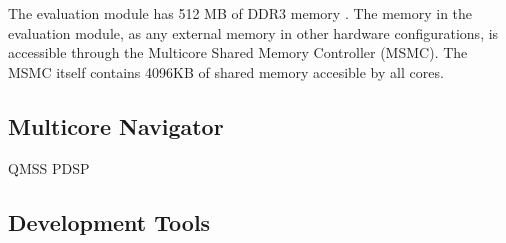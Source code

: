 The evaluation module has 512 MB of DDR3 memory \cite{evmref}. The memory in
the evaluation module, as any external memory in other hardware configurations,
is accessible through the Multicore Shared Memory Controller (MSMC). The MSMC
itself contains 4096KB of shared memory accesible by all cores.

\subsection{Multicore Navigator}
\label{subsec:multicorenav}
QMSS
PDSP
\subsection{Development Tools}
\label{subsec:devtools}


